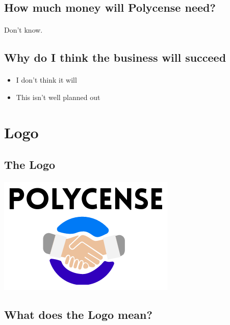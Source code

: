 \subsection{How much money will Polycense need?}
\paragraph{}
Don't know.
\par

\subsection{Why do I think the business will succeed}
\paragraph{}
\begin{itemize}
	\item{I don't think it will}
	\item{This isn't well planned out}
\end{itemize}
\par

\section{Logo}

\subsection{The Logo}
\paragraph{}
\includegraphics{crap-logo.png}
\par

\subsection{What does the Logo mean?}
